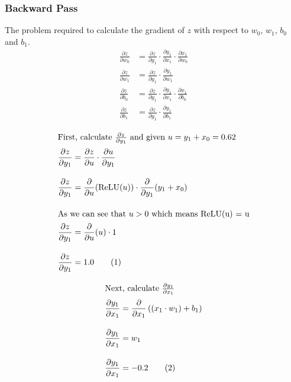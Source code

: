 \documentclass[12pt, a4paper]{article}
\begin{document}
            \subsubsection{Backward Pass}
                The problem required to calculate the gradient of $z$ with respect to ${w}_{0}$, ${w}_{1}$, ${b}_{0}$ and ${b}_{1}$.
                \begin{align*}
                    \frac{\partial z}{\partial {w}_{0}} &= \frac{\partial z}{\partial {y}_{1}} \cdot \frac{\partial {y}_{1}}{\partial {x}_{1}} \cdot \frac{\partial {x}_{1}}{\partial {w}_{0}} \\[1em]
                    \frac{\partial z}{\partial {w}_{1}} &= \frac{\partial z}{\partial {y}_{1}} \cdot \frac{\partial {y}_{1}}{\partial {w}_{1}} \\[1em]
                    \frac{\partial z}{\partial {b}_{0}} &= \frac{\partial z}{\partial {y}_{1}} \cdot \frac{\partial {y}_{1}}{\partial {x}_{1}} \cdot \frac{\partial {x}_{1}}{\partial {b}_{0}} \\[1em]
                    \frac{\partial z}{\partial {b}_{1}} &= \frac{\partial z}{\partial {y}_{1}} \cdot \frac{\partial {y}_{1}}{\partial {b}_{1}}
                \end{align*}

                \begin{align*}
                    \intertext{First, calculate $\frac{\partial z}{\partial {y}_{1}}$ and given $u = {y}_{1} + {x}_{0} = 0.62$}
                    \frac{\partial z}{\partial {y}_{1}} &= \frac{\partial z}{\partial u} \cdot \frac{\partial u}{\partial {y}_{1}} \\[1em]
                    \frac{\partial z}{\partial {y}_{1}} &= \frac{\partial}{\partial u}(\text{ReLU}(u)) \cdot \frac{\partial}{\partial {y}_{1}}({y}_{1} + {x}_{0}) \\[1em]
                    \intertext{As we can see that $u > 0$ which means ReLU(u) = u}
                    \frac{\partial z}{\partial {y}_{1}} &= \frac{\partial}{\partial u}(u) \cdot 1 \\[1em]
                    \frac{\partial z}{\partial {y}_{1}} &= 1.0 \tag{1}
                \end{align*}

                \begin{align*}
                    \intertext{Next, calculate $\frac{\partial {y}_{1}}{\partial {x}_{1}}$}
                    \frac{\partial {y}_{1}}{\partial {x}_{1}} &= \frac{\partial}{\partial {x}_{1}} \left( ({x}_{1} \cdot {w}_{1}) + {b}_{1} \right) \\[1em]
                    \frac{\partial {y}_{1}}{\partial {x}_{1}} &= {w}_{1} \\[1em]
                    \frac{\partial {y}_{1}}{\partial {x}_{1}} &= -0.2 \tag{2}
                \end{align*}
\end{document}
